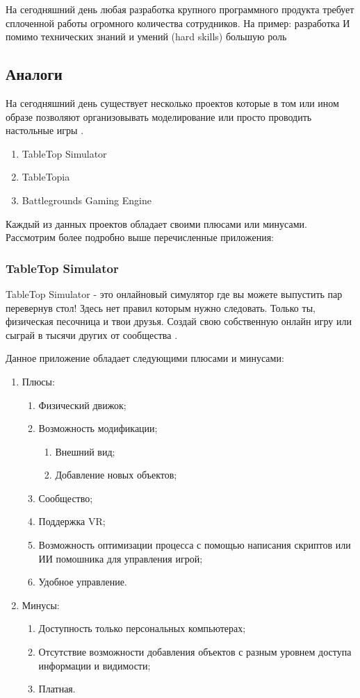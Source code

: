 	На сегодняшний день любая разработка крупного программного продукта требует сплоченной работы огромного количества сотрудников. На пример: разработка  И помимо технических знаний и умений (hard skills) большую роль 
	
\subsection{Аналоги}

	На сегодняшний день существует несколько проектов которые в том или ином образе позволяют организовывать моделирование или просто проводить настольные игры \cite{2}.
	\begin{enumerate}
		\item TableTop Simulator
		\item TableTopia
		\item Battlegrounds Gaming Engine
	\end{enumerate}

	Каждый из данных проектов обладает своими плюсами или минусами. Рассмотрим более подробно выше перечисленные приложения:
	
	\subsubsection{TableTop Simulator}
	
	TableTop Simulator - это онлайновый симулятор где вы можете выпустить пар перевернув стол! Здесь нет правил которым нужно следовать. Только ты, физическая песочница и твои друзья. Создай свою собственную онлайн игру или сыграй в тысячи других от сообщества \cite{3}.
	
	Данное приложение обладает следующими плюсами и минусами:
	\begin{enumerate}	
		\item Плюсы:
		\begin{enumerate}
			\item Физический движок;
			\item Возможность модификации;
			\begin{enumerate}
				\item Внешний вид;
				\item Добавление новых объектов;
			\end{enumerate}
			\item Сообщество;
			\item Поддержка VR;
			\item Возможность оптимизации процесса с помощью написания скриптов или ИИ помошника для управления игрой;
			\item Удобное управление.
		\end{enumerate}
		
		\item Минусы:
		\begin{enumerate}
			\item Доступность только персональных компьютерах;
			\item Отсутствие возможности добавления объектов с разным уровнем доступа информации и видимости;
			\item Платная.
		\end{enumerate}
	\end{enumerate}
	
